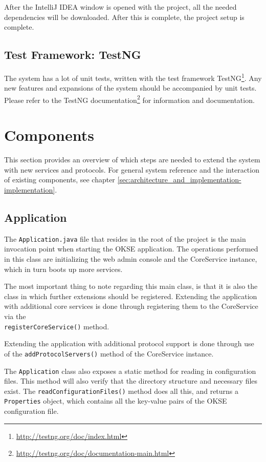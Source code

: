 After the IntelliJ IDEA window is opened with the project, all the needed dependencies will be downloaded. After this is complete, the project setup is complete.

\subsection{Test Framework: TestNG}
The system has a lot of unit tests, written with the test framework TestNG\footnote{\url{http://testng.org/doc/index.html}}. Any new features and expansions of the system should be accompanied by unit tests. Please refer to the TestNG documentation\footnote{\url{http://testng.org/doc/documentation-main.html}} for information and documentation.

\section{Components}
\label{sec:developer_manual-components}
This section provides an overview of which steps are needed to extend the system with new services and protocols. For general system reference and the interaction of existing components, see chapter \ref{sec:architecture_and_implementation-implementation}.

\subsection{Application}
\label{subsec:developer_manual-components-application}

The \verb!Application.java! file that resides in the root of the project is the main invocation point when starting the OKSE application. The operations performed in this class are initializing the web admin console and the CoreService instance, which in turn boots up more services.

The most important thing to note regarding this main class, is that it is also the class in which further extensions should be registered. Extending the application with additional core services is done through registering them to the CoreService via the \\\verb!registerCoreService()! method.

Extending the application with additional protocol support is done through use of the \verb!addProtocolServers()! method of the CoreService instance.

The \verb!Application! class also exposes a static method for reading in configuration files. This method will also verify that the directory structure and necessary files exist. The \verb!readConfigurationFiles()! method does all this, and returns a \verb!Properties! object, which contains all the key-value pairs of the OKSE configuration file.

